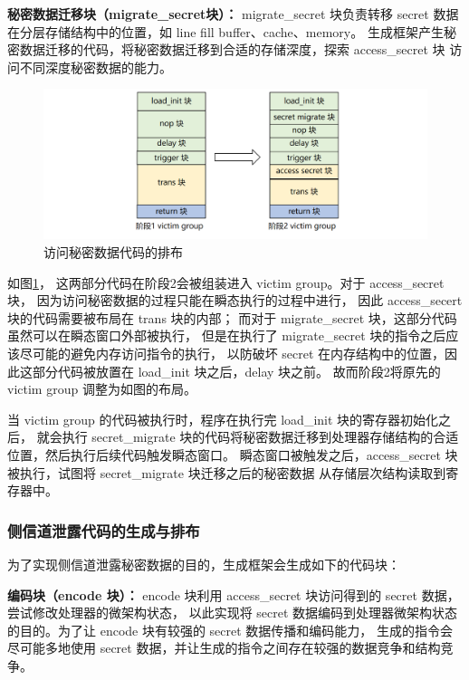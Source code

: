 \textbf{秘密数据迁移块（migrate\_secret块）：}
migrate\_secret 块负责转移 secret 数据在分层存储结构中的位置，如 line fill buffer、cache、memory。
生成框架产生秘密数据迁移的代码，将秘密数据迁移到合适的存储深度，探索 access\_secret 块
访问不同深度秘密数据的能力。\par

\begin{figure}[!h]
    \centering
    \includegraphics[width=\linewidth]{figure/paper/stage2-access-secret.png}
    \caption{访问秘密数据代码的排布}
    \label{paper:access-secret}
\end{figure}

如图\ref{paper:access-secret}，
这两部分代码在阶段2会被组装进入 victim group。对于 access\_secret 块，
因为访问秘密数据的过程只能在瞬态执行的过程中进行，
因此 access\_secert 块的代码需要被布局在 trans 块的内部；
而对于 migrate\_secret 块，这部分代码虽然可以在瞬态窗口外部被执行，
但是在执行了 migrate\_secret 块的指令之后应该尽可能的避免内存访问指令的执行，
以防破坏 secret 在内存结构中的位置，因此这部分代码被放置在 load\_init 块之后，delay 块之前。
故而阶段2将原先的 victim group 调整为如图的布局。\par

当 victim group 的代码被执行时，程序在执行完 load\_init 块的寄存器初始化之后，
就会执行 secret\_migrate 块的代码将秘密数据迁移到处理器存储结构的合适位置，然后执行后续代码触发瞬态窗口。
瞬态窗口被触发之后，access\_secret 块被执行，试图将 secret\_migrate 块迁移之后的秘密数据
从存储层次结构读取到寄存器中。\par

\subsubsection{侧信道泄露代码的生成与排布}

为了实现侧信道泄露秘密数据的目的，生成框架会生成如下的代码块：\par

\textbf{编码块（encode 块）：}
encode 块利用 access\_secret 块访问得到的 secret 数据，尝试修改处理器的微架构状态，
以此实现将 secret 数据编码到处理器微架构状态的目的。为了让 encode 块有较强的 secret 数据传播和编码能力，
生成的指令会尽可能多地使用 secret 数据，并让生成的指令之间存在较强的数据竞争和结构竞争。\par

